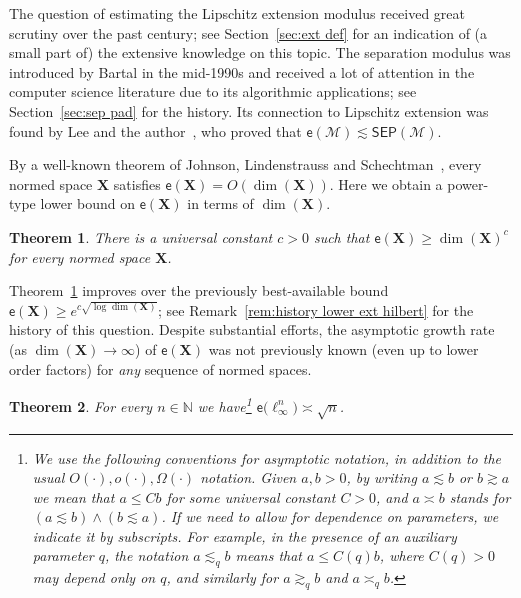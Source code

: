 \documentclass[11pt,reqno]{amsart}
\renewcommand{\le}{\leqslant}
\renewcommand{\ge}{\geqslant}
\newcommand{\X}{\mathbf X}
\newtheorem{theorem}{Theorem}
\theoremstyle{remark}
\newcommand{\MM}{\mathcal{M}}
\newcommand{\N}{\mathbb N}
\newcommand{\ee}{\mathsf{e}}
\renewcommand{\1}{\mathbf 1}
\newcommand{\sep}{\mathsf{SEP}}
\begin{document}
The question of estimating the Lipschitz extension modulus received great scrutiny over the past century; see Section~\ref{sec:ext def}  for an indication of (a small part of) the extensive knowledge on this topic. The separation modulus was introduced by Bartal in the mid-1990s and received a lot of attention in the computer science literature due to its algorithmic applications; see Section~\ref{sec:sep pad} for the history. Its connection to Lipschitz extension was found by Lee and the author~\cite{LN04,LN05}, who proved that $\ee(\MM)\lesssim \sep(\MM)$.

By a well-known theorem of Johnson, Lindenstrauss and Schechtman~\cite{JLS86}, every normed space $\X$ satisfies $\ee(\X)=O(\dim(\X))$. Here we obtain a power-type lower bound on $\ee(\X)$ in terms of $\dim(\X)$.

\begin{theorem}\label{thm:power lower} There is a universal constant $c>0$ such that $\ee(\X)\ge \dim(\X)^c$ for every normed space $\X$.
\end{theorem}
Theorem~\ref{thm:power lower} improves over the previously best-available bound $\ee(\X)\ge e^{c\sqrt{\log\dim(\X)}}$; see Remark~\ref{rem:history lower ext hilbert} for the history of this question. Despite substantial efforts, the asymptotic growth rate (as $\dim(\X)\to \infty$) of $\ee(\X)$ was not previously known (even up to lower order factors)  for {\em any} sequence of normed spaces.

\begin{theorem}\label{thm:ell infty in overview} For every $n\in \N$ we have\footnote{We use the following conventions for asymptotic notation, in addition to the usual $O(\cdot),o(\cdot),\Omega(\cdot)$ notation. Given $a,b>0$, by writing
$a\lesssim b$ or $b\gtrsim a$ we mean that $a\le Cb$ for some
universal constant $C>0$, and $a\asymp b$
stands for $(a\lesssim b) \wedge  (b\lesssim a)$. If we need to allow for dependence on parameters, we indicate it by subscripts. For example, in the presence of an auxiliary parameter $q$, the notation $a\lesssim_q b$ means that $a\le C(q)b$, where $C(q)>0$ may depend only on $q$, and similarly for  $a\gtrsim_q b$ and $a\asymp_q b$.} $\ee\big(\ell_\infty^n\big)\asymp \sqrt{n}$.
\end{theorem}
\end{document}
